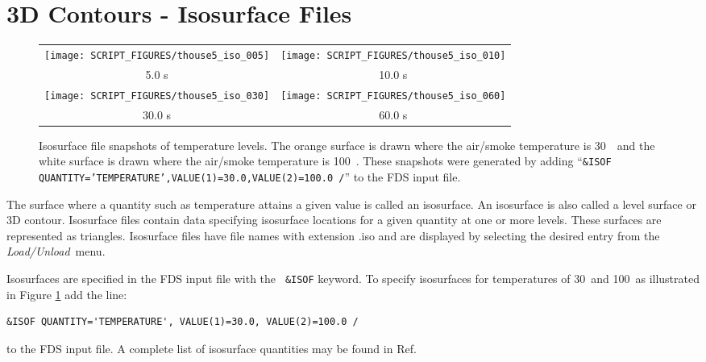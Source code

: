 \documentclass[11pt,twoside]{book}
\begin{document}
\section{3D Contours - Isosurface Files}
\label{section:isosurface}
\begin{figure}[\figoptions]
\begin{center}
\begin{tabular}{cc}
\texttt{[image: SCRIPT\_FIGURES/thouse5\_iso\_005]}&
\texttt{[image: SCRIPT\_FIGURES/thouse5\_iso\_010]}\\
5.0 s&10.0 s\\
\texttt{[image: SCRIPT\_FIGURES/thouse5\_iso\_030]}&
\texttt{[image: SCRIPT\_FIGURES/thouse5\_iso\_060]}\\
30.0 s&60.0 s
\end{tabular}
\end{center}
\caption [Isosurface file snapshots of temperature levels. ]

{ Isosurface file snapshots of temperature levels. The orange
surface is drawn where the air/smoke temperature is 30~\degC\ and
the white surface is drawn where the air/smoke temperature is
100~\degC. These snapshots were generated by adding ``{\tt\&ISOF
QUANTITY='TEMPERATURE',VALUE(1)=30.0,VALUE(2)=100.0 /}'' to the
FDS input file.}
\label{figiso}%
\end{figure}

The surface where a quantity such as temperature attains a given
value is called an isosurface. An isosurface is also called a
level surface or 3D contour. Isosurface files contain data
specifying isosurface locations for a given quantity at one or
more levels. These surfaces are represented as triangles.
Isosurface files have file names with extension .iso and are
displayed by selecting the desired entry from the {\em
Load/Unload}\ menu.

Isosurfaces are specified in the FDS input file with the {\tt
\&ISOF} keyword.  To specify isosurfaces for temperatures of
30\degC\ and 100\degC\ as illustrated in Figure \ref{figiso} add
the line:
\begin{lstlisting}
&ISOF QUANTITY='TEMPERATURE', VALUE(1)=30.0, VALUE(2)=100.0 /
\end{lstlisting}
to the FDS input file.  A complete list of isosurface quantities
may be found in Ref.~\cite{FDS_Users_Guide}
\end{document}
